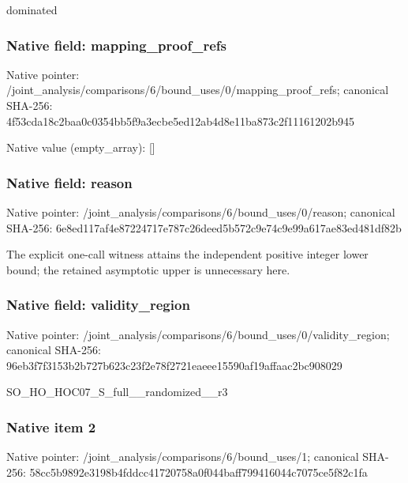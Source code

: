 \documentclass[10pt,a4paper]{article}
\begin{document}
\begingroup\raggedright\sloppy dominated\par\endgroup

\subsubsection{Native field: mapping\_\allowbreak{}proof\_\allowbreak{}refs}
Native pointer: /joint\_\allowbreak{}analysis/comparisons/6/bound\_\allowbreak{}uses/0/mapping\_\allowbreak{}proof\_\allowbreak{}refs; canonical SHA-256: 4f53cda18c2baa0c0354bb5f9a3ecbe5ed12ab4d8e11ba873c2f11161202b945

Native value (empty\_\allowbreak{}array): []

\subsubsection{Native field: reason}
Native pointer: /joint\_\allowbreak{}analysis/comparisons/6/bound\_\allowbreak{}uses/0/reason; canonical SHA-256: 6e8ed117af4e87224717e787c26deed5b572c9e74c9e99a617ae83ed481df82b

\begingroup\raggedright\sloppy The explicit one-call witness attains the independent positive integer lower bound;\allowbreak{} the retained asymptotic upper is unnecessary here.\par\endgroup

\subsubsection{Native field: validity\_\allowbreak{}region}
Native pointer: /joint\_\allowbreak{}analysis/comparisons/6/bound\_\allowbreak{}uses/0/validity\_\allowbreak{}region; canonical SHA-256: 96eb3f7f3153b2b727b623c23f2e78f2721eaeee15590af19affaac2bc908029

\begingroup\raggedright\sloppy SO\_\allowbreak{}HO\_\allowbreak{}HOC07\_\allowbreak{}S\_\allowbreak{}full\_\allowbreak{}\_\allowbreak{}randomized\_\allowbreak{}\_\allowbreak{}r3\par\endgroup

\subsubsection{Native item 2}
Native pointer: /joint\_\allowbreak{}analysis/comparisons/6/bound\_\allowbreak{}uses/1; canonical SHA-256: 58cc5b9892e3198b4fddcc41720758a0f044baff799416044c7075ce5f82c1fa
\end{document}
